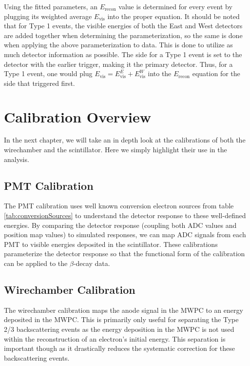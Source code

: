 Using the fitted parameters, an $E_{\mathrm{recon}}$ value is determined
for every event by plugging its weighted average $E_{\mathrm{vis}}$ into the proper equation.
It should be noted that for Type 1 events, the visible energies of both the East and West
detectors are added together when determining the parameterization, so
the same is done when applying the above parameterization to data. This is done to utilize as much
detector information as possible. The side for a Type 1 event is set to
the detector with the earlier trigger, making it the primary detector.
Thus, for a Type 1
event, one would plug $E_{\mathrm{vis}} = E_{\mathrm{vis}}^E + E_{\mathrm{vis}}^W$ into the $E_{\mathrm{recon}}$
equation for the side that triggered first.




\section{Calibration Overview}

In the next chapter, we will take an in depth look at the calibrations of both
the wirechamber and the scintillator. Here we simply highlight their use in the analysis.

\subsection{PMT Calibration}

The PMT calibration uses well known conversion electron sources from table \ref{tab:conversionSources}
to understand the detector response to these well-defined energies. By comparing the detector
response (coupling both ADC values and position map values) to simulated responses,
we can map ADC signals from each PMT to visible energies deposited
in the scintillator. These calibrations parameterize the detector response so that the
functional form of the calibration can be applied to the $\beta$-decay data. 

\subsection{Wirechamber Calibration}

The wirechamber calibration maps the anode signal in the MWPC to an energy deposited in the MWPC. This is
primarily only useful for separating the Type 2/3 backscattering events as the
energy deposition in the MWPC is not used within the reconstruction of an electron's initial
energy. This separation is important though as it drastically reduces the systematic
correction for these backscattering events.
 

